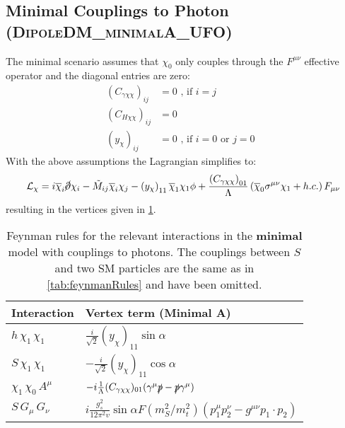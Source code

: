 \documentclass[a4paper,11pt]{article}
\begin{document}
\subsection{Minimal Couplings to Photon (\textsc{\small DipoleDM\_minimalA\_UFO})}

The minimal scenario assumes that $\chi_0$ only couples through the $F^{\mu\nu}$ effective operator and the diagonal entries are zero:
\begin{align}
	(C_{\gamma\chi\chi})_{ij} &= 0 \mbox{ , if $i = j$} \\
	(C_{H\chi\chi})_{ij} &= 0\\
	(y_{\chi})_{ij} & = 0 \mbox{ , if $i = 0$ or $j = 0$ }
\end{align}
With the above assumptions the Lagrangian simplifies to:
\begin{equation}
	\mathcal{L}_{\chi} =  i \overline{\chi}_i \cancel \partial \chi_i - \tilde{M}_{ij} \overline{\chi}_i \chi_j - \left(y_\chi\right)_{11} \overline{\chi}_1 \chi_1 \phi + \frac{\left(C_{\gamma \chi \chi}\right)_{01}}{\Lambda} \left(\overline{\chi}_0 \sigma^{\mu\nu} \chi_1 + h.c.\right) F_{\mu\nu} 
\end{equation}
resulting in the vertices given in \cref{tab:feynmanRulesA}.

\begin{table}[h!]   \centering
	\vspace{0.2cm}
	\begin{tabular}{p{2cm}|p{8.5cm}}
		\toprule
		\textbf{Interaction} & \textbf{Vertex term (Minimal A)}\\ \toprule 
		$ h\,\chi_1\,\chi_1$ & $\frac{i}{\sqrt{2}} (y_{\chi})_{11} \sin\alpha$\\
		$S\,\chi_1\,\chi_1$  & $-\frac{i}{\sqrt{2}} (y_{\chi})_{11} \cos\alpha $\\
		$\chi_1\,\chi_0\, A^\mu$  & $-i \frac{1}{\Lambda} (C_{\gamma\chi\chi})_{01} (\gamma^\mu \slashed{p} - \slashed{p} \gamma^\mu)$\\
		$S\,G_\mu\,G_\nu$  & $i \frac{g_s^2}{12 \pi^2 v} \sin\alpha F(m^2_S/m^2_t) (p_1^\mu p_2^\nu - g^{\mu\nu} p_1\cdot p_2) $\\
		\bottomrule        
	\end{tabular}
	\caption{Feynman rules for the relevant interactions in the {\bf minimal} model with couplings to photons. The couplings between $S$ and two SM particles are the same as in \cref{tab:feynmanRules} and have been omitted. \label{tab:feynmanRulesA}}
\end{table}
\end{document}
